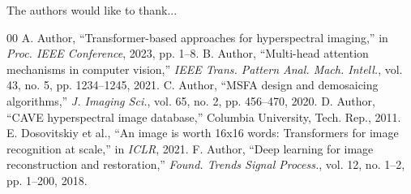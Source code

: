\documentclass[conference]{IEEEtran}
\begin{document}
The authors would like to thank...

\begin{thebibliography}{00}
 A. Author, ``Transformer-based approaches for hyperspectral imaging,'' in \emph{Proc. IEEE Conference}, 2023, pp. 1--8.
 B. Author, ``Multi-head attention mechanisms in computer vision,'' \emph{IEEE Trans. Pattern Anal. Mach. Intell.}, vol. 43, no. 5, pp. 1234--1245, 2021.
 C. Author, ``MSFA design and demosaicing algorithms,'' \emph{J. Imaging Sci.}, vol. 65, no. 2, pp. 456--470, 2020.
 D. Author, ``CAVE hyperspectral image database,'' Columbia University, Tech. Rep., 2011.
 E. Dosovitskiy et al., ``An image is worth 16x16 words: Transformers for image recognition at scale,'' in \emph{ICLR}, 2021.
 F. Author, ``Deep learning for image reconstruction and restoration,'' \emph{Found. Trends Signal Process.}, vol. 12, no. 1--2, pp. 1--200, 2018.
\end{thebibliography}
\end{document}
